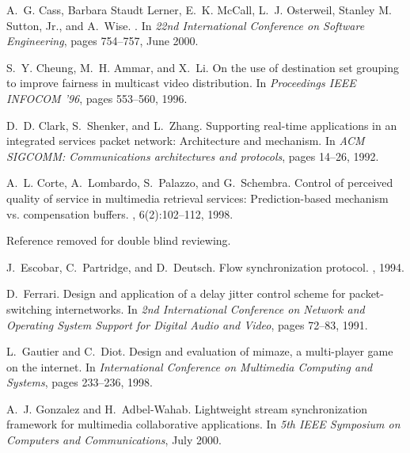 \documentclass{sig-alternate}
\begin{document}
\begin{thebibliography}{10}
A.~G. Cass, {Barbara Staudt Lerner}, E.~K. McCall, L.~J. Osterweil, {Stanley M.
  Sutton, Jr.}, and A.~Wise.
.
\newblock In {\em 22nd International Conference on Software Engineering}, pages
  754--757, June 2000.

S.~Y. Cheung, M.~H. Ammar, and X.~Li.
\newblock On the use of destination set grouping to improve fairness in
  multicast video distribution.
\newblock In {\em Proceedings IEEE INFOCOM '96}, pages 553--560, 1996.

D.~D. Clark, S.~Shenker, and L.~Zhang.
\newblock Supporting real-time applications in an integrated services packet
  network: Architecture and mechanism.
\newblock In {\em {ACM SIGCOMM: Communications architectures and protocols}},
  pages 14--26, 1992.

A.~L. Corte, A.~Lombardo, S.~Palazzo, and G.~Schembra.
\newblock Control of perceived quality of service in multimedia retrieval
  services: Prediction-based mechanism vs. compensation buffers.
, 6(2):102--112, 1998.

Reference removed for double blind reviewing.

J.~Escobar, C.~Partridge, and D.~Deutsch.
\newblock Flow synchronization protocol.
, 1994.

D.~Ferrari.
\newblock Design and application of a delay jitter control scheme for
  packet-switching internetworks.
\newblock In {\em 2nd International Conference on Network and Operating System
  Support for Digital Audio and Video}, pages 72--83, 1991.

L.~Gautier and C.~Diot.
\newblock Design and evaluation of mimaze, a multi-player game on the internet.
\newblock In {\em International Conference on Multimedia Computing and
  Systems}, pages 233--236, 1998.

A.~J. Gonzalez and H.~Adbel-Wahab.
\newblock Lightweight stream synchronization framework for multimedia
  collaborative applications.
\newblock In {\em 5th IEEE Symposium on Computers and Communications}, July
  2000.


\end{thebibliography}
\end{document}
